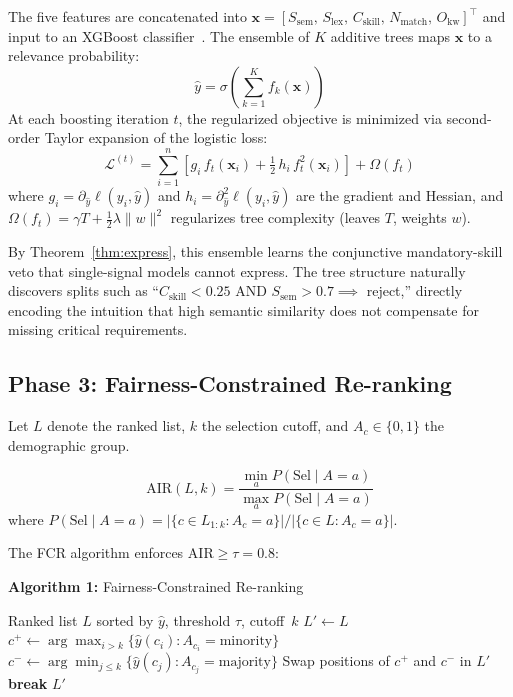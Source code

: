 \documentclass{svproc}
\begin{document}
The five features are concatenated into $\mathbf{x} = [S_{\mathrm{sem}},\, S_{\mathrm{lex}},\, C_{\mathrm{skill}},\, N_{\mathrm{match}},\, O_{\mathrm{kw}}]^\top$ and input to an XGBoost classifier~\cite{chen2016xgboost}. The ensemble of $K$ additive trees maps $\mathbf{x}$ to a relevance probability:
\begin{equation}
    \hat{y} = \sigma\!\left(\sum_{k=1}^K f_k(\mathbf{x})\right)
\end{equation}
At each boosting iteration $t$, the regularized objective is minimized via second-order Taylor expansion of the logistic loss:
\begin{equation}\label{eq:xgb}
    \mathcal{L}^{(t)} = \sum_{i=1}^n \left[ g_i\, f_t(\mathbf{x}_i) + \tfrac{1}{2}\, h_i\, f_t^2(\mathbf{x}_i) \right] + \Omega(f_t)
\end{equation}
where $g_i = \partial_{\hat{y}} \ell(y_i, \hat{y})$ and $h_i = \partial^2_{\hat{y}} \ell(y_i, \hat{y})$ are the gradient and Hessian, and $\Omega(f_t) = \gamma T + \frac{1}{2}\lambda\|w\|^2$ regularizes tree complexity (leaves $T$, weights $w$).

By Theorem~\ref{thm:express}, this ensemble learns the conjunctive mandatory-skill veto that single-signal models cannot express. The tree structure naturally discovers splits such as ``$C_\text{skill} < 0.25$ AND $S_\text{sem} > 0.7 \implies$ reject,'' directly encoding the intuition that high semantic similarity does not compensate for missing critical requirements.

\subsection{Phase 3: Fairness-Constrained Re-ranking}\label{sec:fcr_method}

Let $L$ denote the ranked list, $k$ the selection cutoff, and $A_c \in \{0, 1\}$ the demographic group.

\begin{definition}
\begin{equation}
    \mathrm{AIR}(L, k) = \frac{\min_a P(\text{Sel} \mid A{=}a)}{\max_a P(\text{Sel} \mid A{=}a)}
\end{equation}
where $P(\text{Sel} \mid A{=}a) = |\{c \in L_{1:k} : A_c = a\}| / |\{c \in L : A_c = a\}|$.
\end{definition}

The FCR algorithm enforces $\mathrm{AIR} \geq \tau = 0.8$:

\vspace{3pt}
\noindent\textbf{Algorithm 1:} Fairness-Constrained Re-ranking
\begin{algorithmic}[1]
\REQUIRE Ranked list $L$ sorted by $\hat{y}$, threshold $\tau$, cutoff~$k$
\STATE $L' \leftarrow L$
    \STATE $c^+ \leftarrow \arg\max_{i > k}\{\hat{y}(c_i) : A_{c_i} = \text{minority}\}$
    \STATE $c^- \leftarrow \arg\min_{j \leq k}\{\hat{y}(c_j) : A_{c_j} = \text{majority}\}$
        \STATE Swap positions of $c^+$ and $c^-$ in $L'$
    \ELSE
        \STATE \textbf{break}
    \ENDIF
\ENDWHILE
\RETURN $L'$
\end{algorithmic}
\vspace{3pt}
\end{document}
